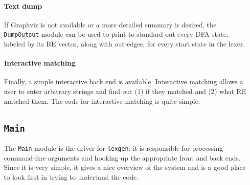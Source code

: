 \documentclass[11pt]{article}
\newcommand{\flex}{\texttt{lexgen}}
\newcommand{\nm}[1]{\texttt{#1}}
\begin{document}
\paragraph{Text dump}

If Graphviz is not available or a more detailed summary is desired, the
\nm{DumpOutput} module can be used to print to standard out every DFA state,
labeled by its RE vector, along with out-edges, for every start state in the
lexer.

\paragraph{Interactive matching}

Finally, a simple interactive back end is available.  Interactive matching
allows a user to enter arbitrary strings and find out (1) if they matched and
(2) what RE matched them.  The code for interactive matching is quite simple.

\subsection{\nm{Main}}

The \nm{Main} module is the driver for \flex{}: it is responsible for processing
command-line arguments and hooking up the appropriate front and back ends. 
Since it is very simple, it gives a nice overview of the system and is a good
place to look first in trying to undertand the code.



\end{document}
